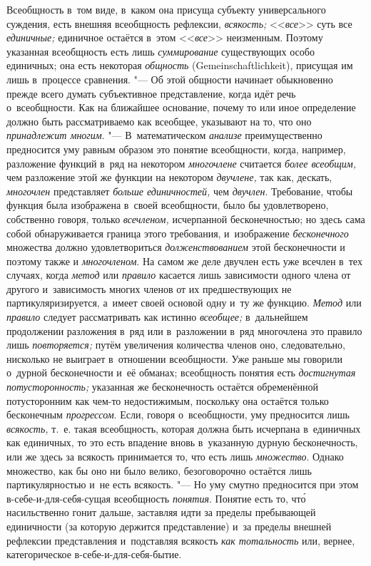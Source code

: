 Всеобщность в~том виде, в~каком она присуща субъекту
универсального суждения, есть внешняя всеобщность рефлексии,
{\em всякость;} <<{\em все}>> суть все {\em единичные;}
единичное остаётся в~этом <<{\em все}>> неизменным.
Поэтому указанная всеобщность есть лишь {\em суммирование}
существующих особо единичных; она есть некоторая
{\em общность} (Gemein\-schaft\-lich\-keit),
присущая им лишь в~процессе сравнения. "--- Об
этой общности начинает обыкновенно прежде всего думать субъективное
представление, когда идёт речь о~всеобщности. Как на
ближайшее основание, почему то или иное определение должно быть
рассматриваемо как всеобщее, указывают на то, что оно
{\em принадлежит многим}. "--- В~математическом {\em анализе}
преимущественно предносится уму равным образом это понятие
всеобщности, когда, например, разложение функций в~ряд на некотором
{\em многочлене} считается {\em более всеобщим,} чем разложение этой же функции
на некотором {\em двучлене,} так как, дескать, {\em многочлен} представляет
{\em больше единичностей,} чем {\em двучлен}. Требование, чтобы функция была
изображена в~своей всеобщности, было бы удовлетворено, собственно говоря,
только {\em всечленом,} исчерпанной бесконечностью; но здесь сама собой
обнаруживается граница этого требования, и~изображение {\em бесконечного}
множества должно удовлетвориться {\em долженствованием} этой бесконечности и
поэтому также и {\em многочленом}. На самом же деле двучлен есть уже всечлен
в~тех случаях, когда {\em метод} или {\em правило} касается лишь зависимости
одного члена от другого и~зависимость многих членов от их предшествующих не
партикуляризируется, а~имеет своей основой одну и~ту же функцию. {\em Метод}
или {\em правило} следует рассматривать как истинно {\em всеобщее;}
в~дальнейшем продолжении разложения в~ряд или в~разложении в~ряд многочлена
это правило лишь {\em повторяется;} путём увеличения количества членов оно,
следовательно, нисколько не выиграет в~отношении всеобщности. Уже раньше мы
говорили о~дурной бесконечности и~её обманах; всеобщность понятия есть
{\em достигнутая потусторонность;} указанная же бесконечность остаётся
обременённой потусторонним как чем-то недостижимым, поскольку она остаётся
только бесконечным {\em прогрессом}. Если, говоря о~всеобщности, уму
предносится лишь {\em всякость,} т.~е. такая всеобщность, которая должна быть
исчерпана в~единичных как единичных, то это есть впадение вновь в~указанную
дурную бесконечность, или же здесь за всякость принимается то, что есть лишь
{\em множество}. Однако множество, как бы оно ни было велико, безоговорочно
остаётся лишь партикулярностью и~не есть всякость. "--- Но уму смутно
предносится при этом в-себе-и-для-себя-сущая всеобщность {\em понятия}. Понятие
есть то, чт\'{о} насильственно гонит дальше, заставляя идти за пределы пребывающей
единичности (за которую держится представление) и~за пределы внешней рефлексии
представления и~подставляя всякость {\em как тотальность} или, вернее,
категорическое в-себе-и-для-себя-бытие.

